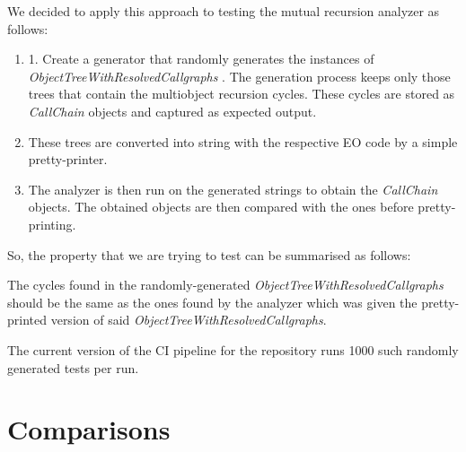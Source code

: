 We decided to apply this approach to testing the mutual recursion analyzer as follows:
\begin{enumerate}
  \item 1. Create a generator that randomly generates the instances of \textit{ObjectTreeWithResolvedCallgraphs} . The generation process keeps only those trees that contain the multiobject recursion cycles. These cycles are stored as \textit{CallChain} objects and captured as expected output. 
  \item These trees are converted into string with the respective EO code by a simple pretty-printer.
  \item The analyzer is then run on the generated strings to obtain the \textit{CallChain} objects. The obtained objects are then compared with the ones before pretty-printing. 
\end{enumerate}

So, the property that we are trying to test can be summarised as follows: 

\begin{definition}
  The cycles found in the randomly-generated \textit{ObjectTreeWithResolvedCallgraphs} should be the same as the ones found by the analyzer which was given the pretty-printed version of said \textit{ObjectTreeWithResolvedCallgraphs}.
\end{definition}

The current version of the CI pipeline for the repository runs 1000 such randomly generated tests per run. 

\section{Comparisons}
\label{eval:comparisons}

